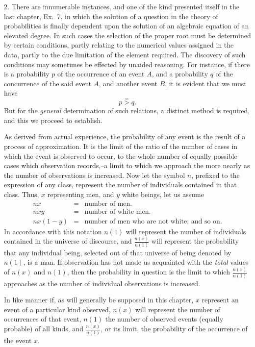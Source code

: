 \documentclass[oneside]{book}
\begin{document}
2. There are innumerable instances, and one of the kind
presented itself in the last chapter, Ex.\ 7, in which the solution
of a question in the theory of probabilities is finally dependent
upon the solution of an algebraic equation of an elevated degree.
In such cases the selection of the proper root must be determined
by certain conditions, partly relating to the numerical values assigned
in the data, partly to the due limitation of the element
required. The discovery of such conditions may sometimes be
effected by unaided reasoning. For instance, if there is a probability
$p$ of the occurrence of an event $A$, and a probability $q$ of
the concurrence of the said event $A$, and another event $B$, it is
evident that we must have
\[
p \stackrel{=}{>} q.
\]
But for the \emph{general} determination of such relations, a distinct
method is required, and this we proceed to establish.

As derived from actual experience, the probability of any
event is the result of a process of approximation. It is the limit
of the ratio of the number of cases in which the event is observed
to occur, to the whole number of equally possible cases which
observation records,--a limit to which we approach the more
nearly as the number of observations is increased. Now let the
symbol $n$, prefixed to the expression of any class, represent the
number of individuals contained in that class. Thus, $x$ representing
men, and $y$ white beings, let us assume
\[
\begin{array}{lll}
nx &=& \text{number of men.}\\
nxy &=& \text{number of white men.}\\
nx(1-y) &=& \text{number of men who are not white; and so on.}
\end{array}
\]
In accordance with this notation $n(1)$ will represent the number
of individuals contained in the universe of discourse, and $\frac{n(x)}{n(1)}$
will represent the probability that any individual being, selected
out of that universe of being denoted by $n(1)$, is a man. If observation
has not made us acquainted with the \emph{total} values of
$n(x)$ and $n(1)$, then the probability in question is the limit to
which $\frac{n(x)}{n(1)}$ approaches as the number of individual observations
is increased.

In like manner if, as will generally be supposed in this chapter,
$x$ represent an event of a particular kind observed, $n(x)$ will
represent the number of occurrences of that event, $n(1)$ the
number of observed events (equally probable) of all kinds, and
$\frac{n(x)}{n(1)}$, or its limit, the probability of the occurrence of the
event $x$.
\end{document}
